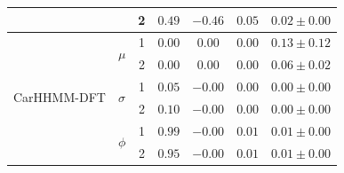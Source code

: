 \begin{table}
{\begin{tabular}{ccccccc}
                           &                               & 2                             & $0.49$                         & $-0.46$                     & $0.05$                             & $0.02 \pm 0.00$                             \\ \hline
\multirow{6}{*}{CarHHMM-DFT}& \multirow{2}{*}{$\mu$}        & 1                             & $0.00$                         & $0.00$                     & $0.00$                             & $0.13 \pm 0.12$                             \\
                           &                               & 2                             & $0.00$                         & $0.00$                     & $0.00$                             & $0.06 \pm 0.02$                             \\
                           & \multirow{2}{*}{$\sigma$}     & 1                             & $0.05$                         & $-0.00$                     & $0.00$                             & $0.00 \pm 0.00$                             \\
                           &                               & 2                             & $0.10$                         & $-0.00$                     & $0.00$                             & $0.00 \pm 0.00$                             \\ 
                           & \multirow{2}{*}{$\phi$}       & 1                             & $0.99$                         & $-0.00$                     & $0.01$                             & $0.01 \pm 0.00$                             \\
                           &                               & 2                             & $0.95$                         & $-0.00$                     & $0.01$                             & $0.01 \pm 0.00$                             \\ \hline
\end{tabular}
}
\label{table:acceleration}
\end{table}



